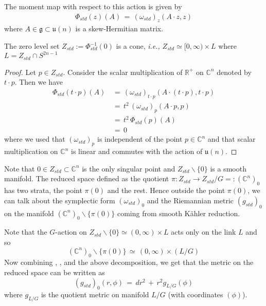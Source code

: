 \documentclass[a4paper,12pt]{article}
\newcommand{\C}{\mathbb{C}}
\newcommand{\R}{\mathbb{R}}
\newcommand{\inv}[1]{#1^{-1}}
\begin{document}
	The moment map with respect to this action is given by
	\begin{align*}\label{standardmoment}
		\Phi_{std}(z) (A) \,=\, (\omega_{std})_z(A\cdot z, z)
	\end{align*}
	where $A\in \mathfrak{g}\subset \mathfrak{u}(n)$ is a skew-Hermitian matrix. 	
	
	\begin{lemma}\label{conelemma}
		The zero level set $Z_{std}:=\inv{\Phi_{std}}(0)$ is a cone,  \textit{i.e.,} $Z_{std} \simeq [0,\infty) \times L$ where $L=Z_{std}\cap S^{2n-1}$
	\end{lemma} 
	\begin{proof}
		Let $p\in Z_{std}$. Consider the scalar multiplication of $\R^+$ on $\C^n$ denoted by $t\cdot p$. Then we have
		\begin{equation*}
			\begin{split}
				\Phi_{std}(t\cdot p) (A) \,&=\, (\omega_{std})_{t\cdot p}(A\cdot (t\cdot p), t\cdot p) \\
				&=\, t^2\, (\omega_{std})_p(A\cdot p, p)\\
				&=\, t^2 \, \Phi_{std}(p)(A)\\
				&=\, 0
			\end{split}
		\end{equation*}
		where we used that $(\omega_{std})_{p}$ is independent of the point $p\in \C^n$ and that scalar multiplication on $\C^n$ is linear and commutes with the action of $\mathfrak{u}(n)$.
	\end{proof}
	
	Note that $0\in Z_{std} \subset \C^n$ is the only singular point and $Z_{std}\backslash\{0\}$ is a smooth manifold. The reduced space defined as the quotient $\pi:Z_{std} \to Z_{std}/G=:(\C^n)_0$ has two strata, the point $\pi(0)$ and the rest. Hence outside the point $\pi(0)$, we can talk about the symplectic form $(\omega_{std})_0$ and the Riemannian metric $(g_{std})_0$ on the manifold $(\C^n)_0\backslash\{\pi(0)\}$ coming from smooth K\"ahler reduction. 
	
	Note that the $G$-action on $Z_{std}\backslash\{0\} \simeq (0,\infty) \times L$ acts only on the link $L$ and so 
	\begin{equation}
		(\C^n)_0\backslash\{\pi(0)\} \,\simeq\, (0,\infty) \times (L/G)
	\end{equation}
	Now combining , , and the above decomposition, we get that the metric on the reduced space can be written as
	\begin{equation}\label{standardquotientmetric}
		(g_{std})_0(r,\phi) \,=\, dr^2 \,+\, r^2 g_{L/G}(\phi)
	\end{equation}
	where $g_{L/G}$ is the quotient metric on manifold $L/G$ (with coordinates $(\phi)$).
\end{document}
